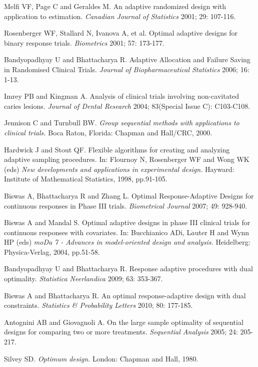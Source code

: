 \begin{thebibliography}
 Melfi VF, Page C and Geraldes M. An adaptive randomized design with application to estimation. \textit{Canadian Journal of Statistics} 2001; 29: 107-116.

 Rosenberger WF, Stallard N, Ivanova A, et al.  Optimal adaptive designs for binary response trials. \textit{Biometrics} 2001; 57: 173-177.

 Bandyopadhyay U and Bhattacharya R. Adaptive Allocation and Failure Saving in Randomised Clinical Trials. \textit{Journal of Biopharmaceutical Statistics} 2006; 16: 1-13.

 Imrey PB and Kingman A. Analysis of clinical trials involving non-cavitated caries lesions. \textit{Journal of Dental Research} 2004; 83(Special Issue C): C103-C108.

 Jennison C and Turnbull BW. \textit{Group sequential methods with applications to clinical trials.} Boca Raton, Florida: Chapman and
Hall/CRC, 2000.

 Hardwick J and Stout QF.  Flexible algorithms for creating and analyzing adaptive sampling procedures. In: Flournoy N, Rosenberger WF and Wong WK (eds) \textit{New developments and applications in experimental design.} Hayward: Institute of Mathematical Statistics, 1998, pp.91-105.

 Biswas A, Bhattacharya R and Zhang L. Optimal Response-Adaptive Designs for continuous responses in Phase III  trials. \textit{Biometrical Journal} 2007; 49: 928-940.

 Biswas A and Mandal S. Optimal adaptive designs in
phase III clinical trials for continuous responses with covariates. In:  Bucchianico ADi, L$\ddot{a}$uter H and Wynn HP (eds) \textit{moDa 7 - Advances in model-oriented design and analysis.} Heidelberg: Physica-Verlag, 2004, pp.51-58.

  Bandyopadhyay U and Bhattacharya R. Response adaptive procedures with dual optimality. \textit{Statistica Neerlandica} 2009; 63: 353-367.

 Biswas A and Bhattacharya R. An optimal response-adaptive design with dual constraints. \textit{Statistics \& Probability Letters} 2010; 80: 177-185.

 Antognini AB and Giovagnoli A. On the large sample optimality of sequential designs for comparing two or more treatments. \textit{Sequential Analysis} 2005; 24: 205-217.

 Silvey SD. \textit{Optimum design.} London: Chapman and Hall, 1980.


\end{thebibliography}
